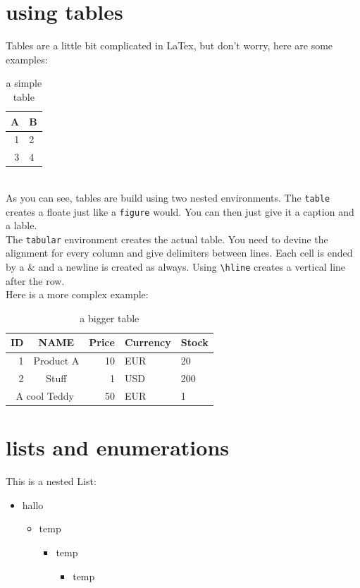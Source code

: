 \documentclass[	%
		fontsize=11pt,  %
		a4paper,	    %
		twoside,		%
		english,		%
		sans,			%
		f1,				%
	]{HsH-report}		%
\begin{document}
	\section{using tables}
		Tables are a little bit complicated in LaTex, but don't worry, here are some examples:
		\begin{table}
			\caption{a simple table}
			\label{tab: table 1}
			\begin{tabular}{r|l}
				A & B \\\hline\hline
				1 & 2 \\\hline
				3 & 4 \\\hline
			\end{tabular}
		\end{table}\\
		As you can see, tables are build using two nested environments. The \lstinline{table} creates a floate just like a \lstinline{figure} would.
		You can then just give it a caption and a lable.\\
		The \lstinline{tabular} environment creates the actual table. You need to devine the alignment for every column and give delimiters between
		lines. Each cell is ended by a \& and a newline is created as always. Using \lstinline{\hline} creates a vertical line after the row.\\
		Here is a more complex example:
		\begin{table}
			\caption{a bigger table}
			\begin{tabular}{r|c|r l|l}
				ID & NAME & Price & Currency & Stock \\\hline
				1 & Product A & 10 & EUR & 20 \\
				2 & Stuff & 1 & USD & 200 \\
				\multicolumn{2}{c|}{A cool Teddy} & 50 & EUR & 1\\\hline
			\end{tabular}
		\end{table}


	\section{lists and enumerations}
		This is a nested List:
		\begin{itemize}
			\item hallo
			\begin{itemize}
				\item temp
				\begin{itemize}
					\item temp
					\begin{itemize}
						\item temp
					\end{itemize}
				\end{itemize}
			\end{itemize}
		\end{itemize}
\end{document}
